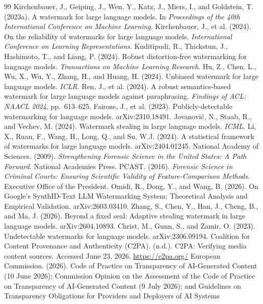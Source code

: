 \documentclass[11pt]{article}
\begin{document}
\begin{thebibliography}{99}
 Kirchenbauer, J., Geiping, J., Wen, Y., Katz, J., Miers, I., and
Goldstein, T. (2023a). A watermark for large language models. In \emph{Proceedings
of the 40th International Conference on Machine Learning}.
 Kirchenbauer, J., et al. (2024). On the reliability of watermarks
for large language models. \emph{International Conference on Learning
Representations}.
 Kuditipudi, R., Thickstun, J., Hashimoto, T., and Liang, P. (2024).
Robust distortion-free watermarking for language models. \emph{Transactions on
Machine Learning Research}.
 Hu, Z., Chen, L., Wu, X., Wu, Y., Zhang, H., and Huang, H. (2024).
Unbiased watermark for large language models. \emph{ICLR}.
 Ren, J., et al. (2024). A robust semantics-based watermark for large
language models against paraphrasing. \emph{Findings of ACL: NAACL 2024}, pp.\
613--625.
 Fairoze, J., et al. (2023). Publicly-detectable watermarking for
language models. arXiv:2310.18491.
 Jovanovi\'c, N., Staab, R., and Vechev, M. (2024). Watermark stealing
in large language models. \emph{ICML}.
 Li, X., Ruan, F., Wang, H., Long, Q., and Su, W.J. (2024). A
statistical framework of watermarks for large language models. arXiv:2404.01245.
\bibitem{nas09} National Academy of Sciences. (2009). \emph{Strengthening Forensic
Science in the United States: A Path Forward}. National Academies Press.
\bibitem{pcast16} PCAST. (2016). \emph{Forensic Science in Criminal Courts: Ensuring
Scientific Validity of Feature-Comparison Methods}. Executive Office of the
President.
 Omidi, R., Dong, Y., and Wang, B. (2026). On Google's SynthID-Text
LLM Watermarking System: Theoretical Analysis and Empirical Validation.
arXiv:2603.03410.
 Zhang, S., Chen, Y., Han, J., Cheng, B., and Ma, J. (2026). Beyond
a fixed seal: Adaptive stealing watermark in large language models. arXiv:2604.10893.
\bibitem{cgz23} Christ, M., Gunn, S., and Zamir, O. (2023). Undetectable watermarks
for language models. arXiv:2306.09194.
 Coalition for Content Provenance and Authenticity (C2PA). (n.d.).
C2PA: Verifying media content sources. Accessed June 23, 2026.
\url{https://c2pa.org/}
 European Commission. (2026). Code of Practice on Transparency of
AI-Generated Content (10 June 2026); Commission Opinion on the Assessment of the
Code of Practice on Transparency of AI-Generated Content (9 July 2026); and
Guidelines on Transparency Obligations for Providers and Deployers of AI Systems

\end{thebibliography}
\end{document}
